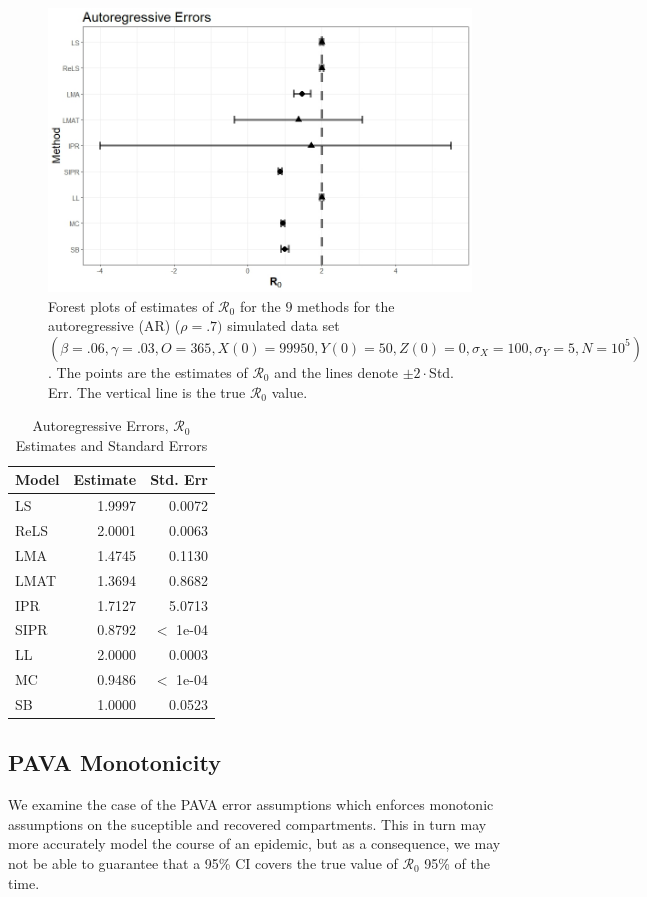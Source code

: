 \documentclass[12pt]{article}
\newcommand{\xxsir}{\ensuremath{9} } %
\newcommand{\rr}{\ensuremath{\mathcal{R}_0}}
\begin{document}
\begin{figure}[H]
  \centering
  \includegraphics[scale=0.5]{images/AR.jpeg}
  \caption{Forest plots of estimates of $\rr$ for the \xxsir methods for the autoregressive (AR) ($\rho=.7)$ simulated data set $(\beta=.06, \gamma=.03, O=365, X(0)=99950, Y(0)=50, Z(0)=0, \sigma_X=100, \sigma_Y=5, N=10^5)$.  The points are the estimates of $\rr$ and the lines denote $\pm 2\cdot $Std. Err.  The vertical line is the true $\rr$ value.}
  \end{figure}\label{fig:ar-res}
\begin{table}[H]
	
	\centering
	\begin{tabular}[t]{l|r|r}
		\hline
		Model & Estimate & Std. Err\\
		\hline
		LS & 1.9997 & 0.0072\\
		\hline
		ReLS & 2.0001 & 0.0063\\
		\hline
		LMA & 1.4745 & 0.1130\\
		\hline
		LMAT & 1.3694 & 0.8682\\
		\hline
		IPR & 1.7127 & 5.0713\\
		\hline
		SIPR & 0.8792 & $<$ 1e-04 \\
		\hline
		LL & 2.0000 & 0.0003\\
		\hline
		MC & 0.9486 & $<$ 1e-04 \\
		\hline
		SB & 1.0000 & 0.0523\\
		\hline
	\end{tabular}
        \caption{Autoregressive Errors, $\rr$ Estimates and Standard Errors}\label{tab:ar-res}
\end{table}

\subsection{PAVA Monotonicity}\label{sec:res-PAVA}
We examine the case of the PAVA error assumptions which enforces monotonic assumptions on the suceptible and recovered compartments.  This in turn may more accurately model the course of an epidemic, but as a consequence, we may not be able to guarantee that a 95\% CI covers the true value of $\rr$ 95\% of the time.
\end{document}

